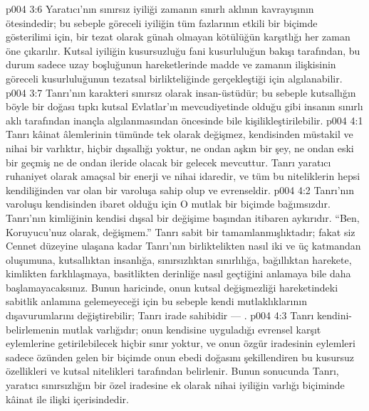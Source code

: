 \vs p004 3:6 Yaratıcı’nın sınırsız iyiliği zamanın sınırlı aklının kavrayışının ötesindedir; bu sebeple göreceli iyiliğin tüm fazlarının etkili bir biçimde gösterilimi için, bir tezat olarak günah olmayan kötülüğün karşıtlığı her zaman öne çıkarılır. Kutsal iyiliğin kusursuzluğu fani kusurluluğun bakışı tarafından, bu durum sadece uzay boşluğunun hareketlerinde madde ve zamanın ilişkisinin göreceli kusurluluğunun tezatsal birlikteliğinde gerçekleştiği için algılanabilir.
\vs p004 3:7 Tanrı’nın karakteri sınırsız olarak insan\hyp{}üstüdür; bu sebeple kutsallığın böyle bir doğası tıpkı kutsal Evlatlar’ın mevcudiyetinde olduğu gibi insanın sınırlı aklı tarafından inançla algılanmasından öncesinde bile kişilikleştirilebilir.
\vs p004 4:1 Tanrı kâinat âlemlerinin tümünde tek olarak değişmez, kendisinden müstakil ve nihai bir varlıktır, hiçbir dışsallığı yoktur, ne ondan aşkın bir şey, ne ondan eski bir geçmiş ne de ondan ileride olacak bir gelecek mevcuttur. Tanrı yaratıcı ruhaniyet olarak amaçsal bir enerji ve nihai idaredir, ve tüm bu niteliklerin hepsi kendiliğinden var olan bir varoluşa sahip olup ve evrenseldir.
\vs p004 4:2 Tanrı’nın varoluşu kendisinden ibaret olduğu için O mutlak bir biçimde bağımsızdır. Tanrı’nın kimliğinin kendisi dışsal bir değişime başından itibaren aykırıdır. “Ben, Koruyucu’nuz olarak, değişmem.” Tanrı sabit bir tamamlanmışlıktadır; fakat siz Cennet düzeyine ulaşana kadar Tanrı’nın birliktelikten nasıl iki ve üç katmandan oluşumuna, kutsallıktan insanlığa, sınırsızlıktan sınırlılığa, bağıllıktan harekete, kimlikten farklılaşmaya, basitlikten derinliğe nasıl geçtiğini anlamaya bile daha başlamayacaksınız. Bunun haricinde, onun kutsal değişmezliği hareketindeki sabitlik anlamına gelemeyeceği için bu sebeple kendi mutlaklıklarının dışavurumlarını değiştirebilir; Tanrı irade sahibidir --- .
\vs p004 4:3 Tanrı kendini\hyp{}belirlemenin mutlak varlığıdır; onun kendisine uyguladığı evrensel karşıt eylemlerine getirilebilecek hiçbir sınır yoktur, ve onun özgür iradesinin eylemleri sadece özünden gelen bir biçimde onun ebedi doğasını şekillendiren bu kusursuz özellikleri ve kutsal nitelikleri tarafından belirlenir. Bunun sonucunda Tanrı, yaratıcı sınırsızlığın bir özel iradesine ek olarak nihai iyiliğin varlığı biçiminde kâinat ile ilişki içerisindedir.
